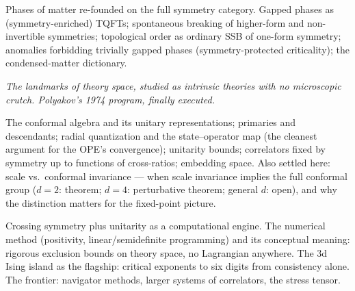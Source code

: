 Phases of matter re-founded on the full symmetry category. Gapped phases as (symmetry-enriched) TQFTs; spontaneous breaking of higher-form and non-invertible symmetries; topological order as ordinary SSB of one-form symmetry; anomalies forbidding trivially gapped phases (symmetry-protected criticality); the condensed-matter dictionary.


\noin \emph{The landmarks of theory space, studied as intrinsic theories with no microscopic crutch. Polyakov's 1974 program, finally executed.}

The conformal algebra and its unitary representations; primaries and descendants; radial quantization and the state--operator map (the cleanest argument for the OPE's convergence); unitarity bounds; correlators fixed by symmetry up to functions of cross-ratios; embedding space. Also settled here: scale vs.\ conformal invariance --- when scale invariance implies the full conformal group ($d=2$: theorem; $d=4$: perturbative theorem; general $d$: open), and why the distinction matters for the fixed-point picture.

Crossing symmetry plus unitarity as a computational engine. The numerical method (positivity, linear/semidefinite programming) and its conceptual meaning: rigorous exclusion bounds on theory space, no Lagrangian anywhere. The 3d Ising island as the flagship: critical exponents to six digits from consistency alone. The frontier: navigator methods, larger systems of correlators, the stress tensor.

